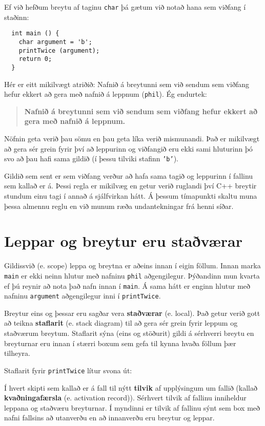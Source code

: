 Ef við hefðum breytu af taginu {\tt char} þá gætum við notað hana sem viðfang í staðinn:

\begin{verbatim}
  int main () {
    char argument = 'b';
    printTwice (argument);
    return 0;
  }
\end{verbatim}
%
Hér er eitt mikilvægt atriðið: Nafnið á breytunni sem við sendum sem viðfang hefur ekkert að gera með nafnið á leppnum ({\tt phil}).
Ég endurtek:
\begin{quote}

{\bf Nafnið á breytunni sem við sendum sem viðfang hefur ekkert að gera með nafnið á leppnum.}

\end{quote}

Nöfnin geta verið þau sömu en þau geta líka verið mismunandi.
Það er mikilvægt að gera sér grein fyrir því að leppurinn og viðfangið eru ekki sami hluturinn
þó svo að þau hafi sama gildið (í þessu tilviki stafinn {\tt 'b'}).

Gildið sem sent er sem viðfang verður að hafa sama tagið og leppurinn í fallinu sem kallað er á.
Þessi regla er mikilvæg en getur verið ruglandi því C++ breytir stundum einu tagi í annað á sjálfvirkan hátt.
Á þessum tímapunkti skaltu muna þessa almennu reglu en við munum ræða undantekningar frá henni síðar.

\section {Leppar og breytur eru staðværar}

Gildissvið (e. scope) leppa og breytna er aðeins innan í eigin föllum.
Innan marka {\tt main} er ekki neinn hlutur með nafninu {\tt phil} aðgengilegur.
Þýðandinn mun kvarta ef þú reynir að nota það nafn innan í {\tt main}.
Á sama hátt er enginn hlutur með nafninu {\tt argument} aðgengilegur inni í {\tt printTwice}.

Breytur eins og þessar eru sagðar vera {\bf staðværar} (e. local).
Það getur verið gott að teikna {\bf staflarit} (e. stack diagram) til að gera sér grein fyrir leppum og staðværum breytum.
Staflarit sýna (eins og stöðurit) gildi á sérhverri breytu en breyturnar eru innan í stærri boxum sem gefa til kynna hvaða föllum þær tilheyra.

Staflarit fyrir {\tt printTwice} lítur svona út:

\vspace{0.1in}
\centerline{}
\vspace{0.1in}
%
Í hvert skipti sem kallað er á fall til nýtt {\bf tilvik} af upplýsingum um fallið (kallað {\bf kvaðningafærsla} (e. activation record)).
Sérhvert tilvik af fallinu inniheldur leppana og staðværu breyturnar.
Í myndinni er tilvik af fallinu sýnt sem box með nafni fallsins að utanverðu en að innanverðu eru breytur og leppar.

